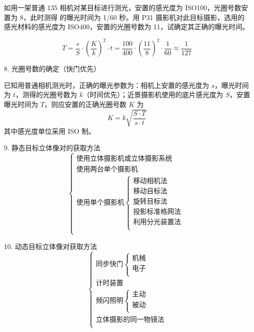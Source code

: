 \documentclass[a4paper]{ctexart}
\newtheorem{example}{\hskip 2em 例}[section]
\newtheorem*{sol}{\hskip 2em 解}
\begin{document}
\begin{example}
如用一架普通 135 相机对某目标进行测光，安置的感光度为 ISO100，光圈号数安置为 8，此时测得 的曝光时间为 1/60 秒。用 P31 摄影机对此目标摄影，选用的感光材料的感光度为 ISO400，安置的光圈号数为 11，试确定其正确的曝光时间。
\end{example}
\begin{sol}
$$
T=\frac{s}{S}\cdot \left( \frac{K}{k} \right) ^2\cdot t=\frac{100}{400}\cdot \left( \frac{11}{8} \right) ^2\cdot \frac{1}{60}\approx \frac{1}{127}
$$
\end{sol}

8. 光圈号数的确定（快门优先）

已知用普通相机测光时，正确的曝光参数为：相机上安置的感光度为 $s$，曝光时间为 $t$，测得的光圈号数为 $k$（时间优先）；近景摄影机使用的底片感光度为 $S$，安置曝光时间为 $T$，则应安置的正确光圈号数 $K$ 为
$$
K=k\sqrt{\frac{S\cdot T}{s\cdot t}}
$$
其中感光度单位采用 ISO 制。

9. 静态目标立体像对的获取方法
$$
\begin{cases}
	\text{使用立体摄影机或立体摄影系统}\\
	\text{使用两台单个摄影机}\\
	\text{使用单个摄影机}\begin{cases}
	\text{移动相机法}\\
	\text{移动目标法}\\
	\text{旋转目标法}\\
	\text{投影标准格网法}\\
	\text{利用分光装置法}\\
\end{cases}\\
\end{cases}
$$

10. 动态目标立体像对获取方法
$$
\begin{cases}
	\text{同步快门}\begin{cases}
	\text{机械}\\
	\text{电子}\\
\end{cases}\\
	\text{计时装置}\\
	\text{频闪照明}\begin{cases}
	\text{主动}\\
	\text{被动}\\
\end{cases}\\
	\text{立体摄影的同一物镜法}\\
\end{cases}
$$
\end{document}
